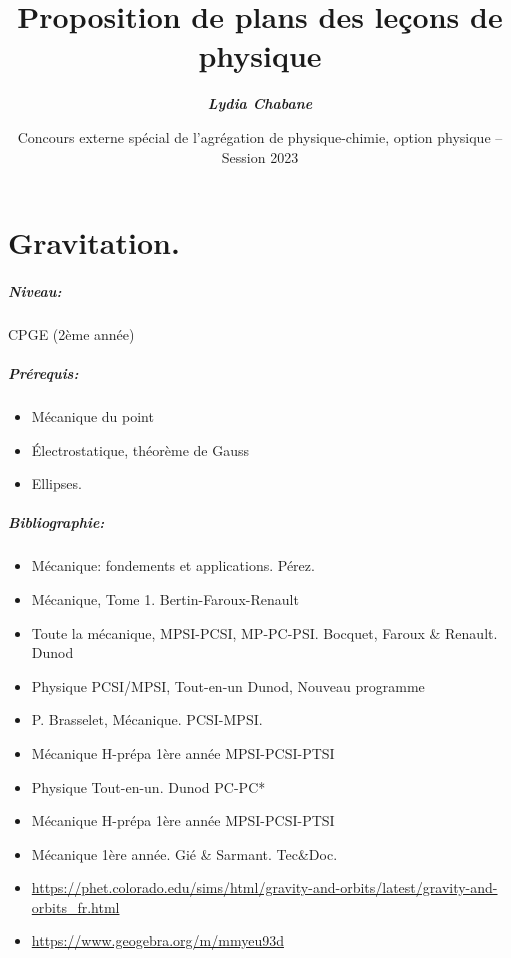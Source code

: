 \documentclass[11pt]{report}
\title{\textbf{Proposition de plans des leçons de physique}}
\date{Concours externe spécial de l'agrégation de physique-chimie, option physique -- Session 2023}
\author{\color{mycolor2}\bfseries \textit{Lydia Chabane}}
\numberwithin{figure}{section}
\numberwithin{equation}{section}
\numberwithin{table}{section}
\newcommand{\1}{\boldsymbol{1}}
\begin{document}
\maketitle


\begingroup
\hypersetup{linkcolor=black}
\tableofcontents
\endgroup


\chapter{Gravitation.}


\paragraph*{Niveau:} CPGE (2ème année)
\paragraph*{Prérequis:} 
\begin{itemize}
\item Mécanique du point
\item \'Electrostatique, théorème de Gauss
\item Ellipses.
\end{itemize}

\paragraph*{Bibliographie:}
\begin{itemize}
\item Mécanique: fondements et applications. Pérez.
\item Mécanique, Tome 1. Bertin-Faroux-Renault
\item Toute la mécanique, MPSI-PCSI, MP-PC-PSI. Bocquet, Faroux \& Renault. Dunod
\item Physique PCSI/MPSI, Tout-en-un Dunod, Nouveau programme
\item P. Brasselet, Mécanique. PCSI-MPSI.
\item  Mécanique H-prépa 1ère année MPSI-PCSI-PTSI
\item Physique Tout-en-un. Dunod PC-PC* 
\item Mécanique H-prépa 1ère année MPSI-PCSI-PTSI
\item Mécanique 1ère année. Gié \& Sarmant. Tec\&Doc.
\item \url{https://phet.colorado.edu/sims/html/gravity-and-orbits/latest/gravity-and-orbits_fr.html}
\item \url{https://www.geogebra.org/m/mmyeu93d}
\end{itemize}
\end{document}
